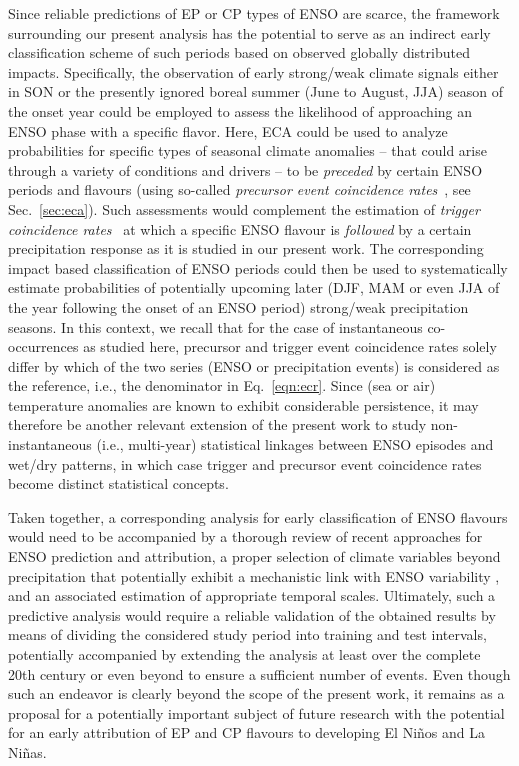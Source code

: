 \documentclass[utf8]{frontiersSCNS} %
\begin{document}
Since reliable predictions of EP or CP types of ENSO are scarce, the framework surrounding our present analysis has the potential to serve as an indirect early classification scheme of such periods based on observed globally distributed impacts. Specifically, the observation of early strong/weak climate signals either in SON or the presently ignored boreal summer (June to August, JJA) season of the onset year could be employed to assess the likelihood of approaching an ENSO phase with a specific flavor. Here, ECA could be used to analyze probabilities for specific types of seasonal climate anomalies -- that could arise through a variety of conditions and drivers -- to be {\em preceded} by certain ENSO periods and flavours (using so-called {\em precursor event coincidence rates}~\citep{Donges2016a}, see Sec.~\ref{sec:eca}). Such assessments would complement the estimation of {\em trigger coincidence rates}~\citep{Donges2016a} at which a specific ENSO flavour is {\em followed} by a certain precipitation response as it is studied in our present work. The corresponding impact based classification of ENSO periods could then be used to systematically estimate probabilities of potentially upcoming later (DJF, MAM or even JJA of the year following the onset of an ENSO period) strong/weak precipitation seasons. In this context, we recall that for the case of instantaneous co-occurrences as studied here, precursor and trigger event coincidence rates solely differ by which of the two series (ENSO or precipitation events) is considered as the reference, i.e., the denominator in Eq.~\eqref{eqn:ecr}. Since (sea or air) temperature anomalies are known to exhibit considerable persistence, it may therefore be another relevant extension of the present work to study non-instantaneous (i.e., multi-year) statistical linkages between ENSO episodes and wet/dry patterns, in which case trigger and precursor event coincidence rates become distinct statistical concepts. 

Taken together, a corresponding analysis for early classification of ENSO flavours would need to be accompanied by a thorough review of recent approaches for ENSO prediction and attribution, a proper selection of climate variables beyond precipitation that potentially exhibit a mechanistic link with ENSO variability \citep{DiCapua2019}, and an associated estimation of appropriate temporal scales. Ultimately, such a predictive analysis would require a reliable validation of the obtained results by means of dividing the considered study period into training and test intervals, potentially accompanied by extending the analysis at least over the complete 20th century or even beyond to ensure a sufficient number of events. Even though such an endeavor is clearly beyond the scope of the present work, it remains as a proposal for a potentially important subject of future research with the potential for an early attribution of EP and CP flavours to developing El Ni\~nos and La Ni\~nas.
\end{document}
